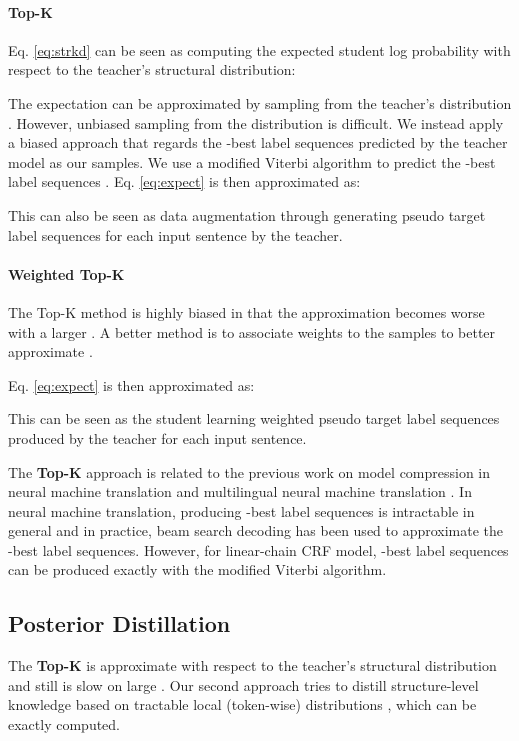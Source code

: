\documentclass[11pt,a4paper]{article}
\begin{document}
\paragraph{Top-K}
Eq. \ref{eq:strkd} can be seen as computing the expected student log probability with respect to the teacher's structural distribution:

The expectation can be approximated by sampling from the teacher's distribution . However, unbiased sampling from the distribution is difficult. We instead apply a biased approach that regards the -best label sequences predicted by the teacher model as our samples. We use a modified Viterbi algorithm to predict the -best label sequences . Eq. \ref{eq:expect} is then approximated as:

This can also be seen as data augmentation through generating  pseudo target label sequences for each input sentence by the teacher.

\paragraph{Weighted Top-K}
The Top-K method is highly biased in that the approximation becomes worse with a larger  . A better method is to associate weights to the  samples to better approximate .

Eq. \ref{eq:expect} is then approximated as:

This can be seen as the student learning weighted pseudo target label sequences produced by the teacher for each input sentence.

The \textbf{Top-K} approach is related to the previous work on model compression in neural machine translation \cite{kim-rush-2016-sequence} and multilingual neural machine translation \cite{tan2018multilingual}.
In neural machine translation, producing -best label sequences is intractable in general and in practice, beam search decoding has been used to approximate the -best label sequences. However, for linear-chain CRF model, -best label sequences can be produced exactly with the modified Viterbi algorithm.

\subsection{Posterior Distillation}
\label{sec:posterior}
The \textbf{Top-K} is approximate with respect to the teacher's structural distribution and still is slow on large . Our second approach tries to distill structure-level knowledge based on tractable local (token-wise) distributions , which can be exactly computed.
\end{document}
